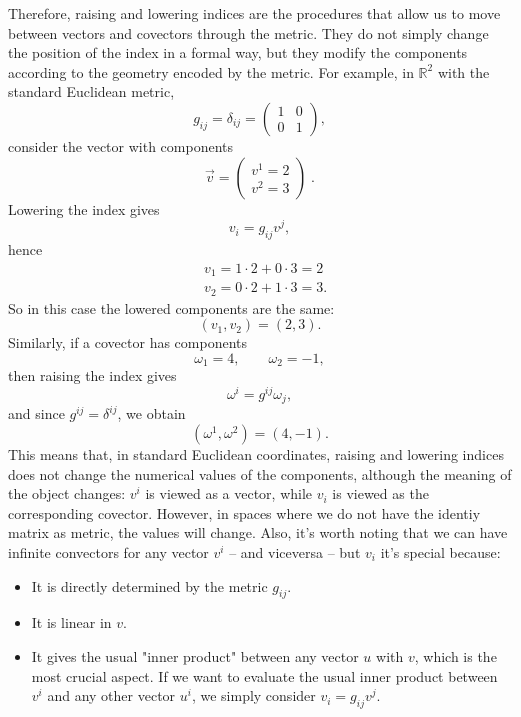 \documentclass[12pt,a4paper]{article}
\begin{document}
Therefore, raising and lowering indices are the procedures that allow us to move between vectors and covectors through the metric. They do not simply change the position of the index in a formal way, but they modify the components according to the geometry encoded by the metric.
For example, in $\mathbb{R}^2$ with the standard Euclidean metric,
\begin{equation*}
	g_{ij}=\delta_{ij}=
	\begin{pmatrix}
		1 & 0\\
		0 & 1
	\end{pmatrix},
\end{equation*}
consider the vector with components
\begin{equation*}
	\vec{v} = \begin{pmatrix} v^1 = 2 \\ v^2 = 3 \end{pmatrix} \;.
\end{equation*}
Lowering the index gives
\begin{equation*}
	v_i=g_{ij}v^j,
\end{equation*}
hence
\begin{align*}
	&v_1=1\cdot 2+0\cdot 3=2\\
	&v_2=0\cdot 2+1\cdot 3=3.
\end{align*}
So in this case the lowered components are the same:
\begin{equation*}
	(v_1,v_2)=(2,3).
\end{equation*}
Similarly, if a covector has components
\begin{equation*}
	\omega_1=4,\qquad \omega_2=-1,
\end{equation*}
then raising the index gives
\begin{equation*}
	\omega^i=g^{ij}\omega_j,
\end{equation*}
and since $g^{ij}=\delta^{ij}$, we obtain
\begin{equation*}
	(\omega^1,\omega^2)=(4,-1).
\end{equation*}
This means that, in standard Euclidean coordinates, raising and lowering indices does not change the numerical values of the components, although the meaning of the object changes: $v^i$ is viewed as a vector, while $v_i$ is viewed as the corresponding covector. However, in spaces where we do not have the identiy matrix as metric, the values will change. Also, it's worth noting that we can have infinite convectors for any vector $v^i$ -- and viceversa -- but $v_i$ it's special because:
\begin{itemize}
	\item It is directly determined by the metric $g_{ij}$.
	\item It is linear in $v$.
	\item It gives the usual "inner product" between any vector $u$ with $v$, which is the most crucial aspect. If we want to evaluate the usual inner product between $v^i$ and any other vector $u^i$, we simply consider $v_i = g_{ij} v^j$.
\end{itemize}
\end{document}
